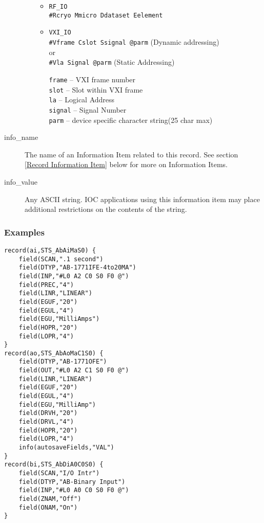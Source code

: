 \begin{description}
\begin{itemize}
\begin{itemize}
\item \verb|RF_IO| \\
\verb|#Rcryo Mmicro Ddataset Eelement|

\item \verb|VXI_IO| \\
\verb|#Vframe Cslot Ssignal @parm| (Dynamic addressing) \\
     or \\
\verb|#Vla Signal @parm|  (Static Addressing)

\verb|frame| -- VXI frame number \\
\verb|slot| -- Slot within VXI frame \\
\verb|la| -- Logical Address \\
\verb|signal| -- Signal Number \\
\verb|parm| -- device specific character string(25 char max)
\end{itemize}
\end{itemize}

\item [info\_name] The name of an Information Item related to this record.
See section \ref{Record Information Item} below for more on Information Items.

\item [info\_value] Any ASCII string.
IOC applications using this information item may place additional restrictions on the contents of the string.

\end{description}

\subsubsection{Examples}

\begin{lstlisting}[language=dbd]
record(ai,STS_AbAiMaS0) {
    field(SCAN,".1 second")
    field(DTYP,"AB-1771IFE-4to20MA")
    field(INP,"#L0 A2 C0 S0 F0 @")
    field(PREC,"4")
    field(LINR,"LINEAR")
    field(EGUF,"20")
    field(EGUL,"4")
    field(EGU,"MilliAmps")
    field(HOPR,"20")
    field(LOPR,"4")
}
record(ao,STS_AbAoMaC1S0) {
    field(DTYP,"AB-1771OFE")
    field(OUT,"#L0 A2 C1 S0 F0 @")
    field(LINR,"LINEAR")
    field(EGUF,"20")
    field(EGUL,"4")
    field(EGU,"MilliAmp")
    field(DRVH,"20")
    field(DRVL,"4")
    field(HOPR,"20")
    field(LOPR,"4")
    info(autosaveFields,"VAL")
}
record(bi,STS_AbDiA0C0S0) {
    field(SCAN,"I/O Intr")
    field(DTYP,"AB-Binary Input")
    field(INP,"#L0 A0 C0 S0 F0 @")
    field(ZNAM,"Off")
    field(ONAM,"On")
}
\end{lstlisting}


